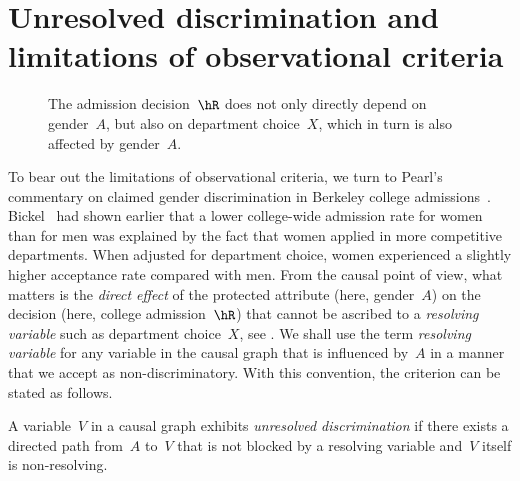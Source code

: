 \section{Unresolved discrimination and limitations of observational criteria}
\label{sec:limitations}

\begin{figure}
  \begin{center}
  \caption{The admission decision~$\hR$ does not only directly depend on
  gender~$A$, but also on department choice~$X$, which in turn is also
  affected by gender~$A$.}
  \label{fig:pearl}
  \end{center}
\end{figure}

To bear out the limitations of observational criteria, we turn to Pearl's
commentary on claimed gender discrimination in Berkeley college
admissions~\cite[Section 4.5.3]{Pearl2009}. Bickel~\cite{Bickel1975} had shown
earlier that a lower college-wide admission rate for women than for men was
explained by the fact that women applied in more competitive departments. When
adjusted for department choice, women experienced a slightly higher acceptance
rate compared with men. From the causal point of view, what matters is the
\emph{direct effect} of the protected attribute (here, gender~$A$) on the
decision (here, college admission~$\hR$) that cannot be ascribed to a
\emph{resolving variable} such as department choice~$X$, see .
We shall use the term \emph{resolving variable} for any variable in the causal
graph that is influenced by~$A$ in a manner that we accept as
non-discriminatory. With this convention, the criterion can be stated as
follows.

\begin{definition}
  A variable~$V$ in a causal graph exhibits \emph{unresolved discrimination} if
  there exists a directed path from~$A$ to~$V$ that is not blocked by a
  resolving variable and~$V$ itself is non-resolving.
\end{definition}

